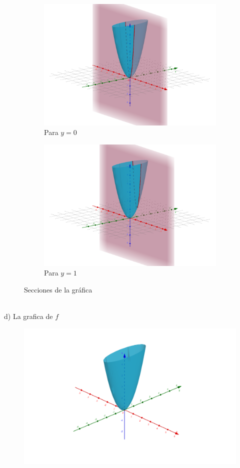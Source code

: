 \documentclass[letterpaper,11pt]{article}
\begin{document}
\begin{enumerate}
\begin{figure}[h!]
\begin{subfigure}{0.3\textwidth}
		\includegraphics[width=\linewidth]{img/1c2}
		\caption{Para $ y = 0 $}
	\end{subfigure}
	\begin{subfigure}{0.3\textwidth}
		\includegraphics[width=\linewidth]{img/1c3}
		\caption{Para $ y = 1 $}
	\end{subfigure}
	\caption{Secciones de la gráfica }
\end{figure}\\
\newpage
d) La grafica de $f$\\
\begin{figure}[h!]
	\centering
	\includegraphics[width=15cm]{img/1d}

\end{figure}
\end{enumerate}
\end{document}
